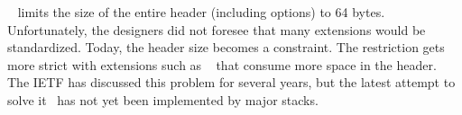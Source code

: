 
\tcp~\cite{rfc793} limits the size of the entire \tcp header (including options) to 64 bytes. Unfortunately, the \tcp designers did not foresee that many \tcp extensions would be standardized. Today, the \tcp header size becomes a constraint.
The restriction gets more strict with extensions such as \mptcp~\cite{rfc6824} that consume more space in the \tcp header. The IETF has discussed this problem for several years, but the latest attempt to solve it~\cite{draft-ietf-tcpm-tcp-edo-10} has not yet been implemented by major \tcp stacks.
%
%


